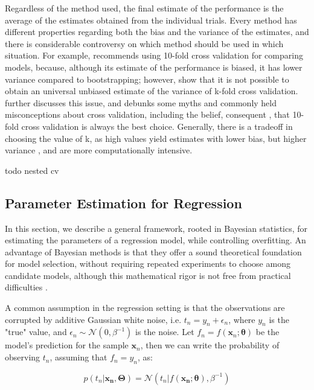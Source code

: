 \documentclass[12pt]{book}
\begin{document}
Regardless of the method used, the final estimate of the performance is the average of the estimates obtained from the individual trials. Every method has different properties regarding both the bias and the variance of the estimates, and there is considerable controversy on which method should be used in which situation. For example, \cite{cv_bootstrap} recommends using 10-fold cross validation for comparing models, because, although its estimate of the performance is biased, it has lower variance compared to bootstrapping; however, \cite{no_unbiased_cv} show that it is not possible to obtain an universal unbiased estimate of the variance of k-fold cross validation. \cite{cvmyths} further discusses this issue, and debunks some myths and commonly held misconceptions about cross validation, including the belief, consequent \cite{cv_bootstrap}, that 10-fold cross validation is always the best choice. Generally, there is a tradeoff in choosing the value of k, as high values yield estimates with lower bias, but higher variance \citep{cv_survey}, and are more computationally intensive.

todo nested cv \cite{nested_cv}

\subsection{Parameter Estimation for Regression}
\label{sec:regression_fit}

In this section, we describe a general framework, rooted in Bayesian statistics, for estimating the parameters of a regression model, while controlling overfitting. An advantage of Bayesian methods is that they offer a sound theoretical foundation for model selection, without requiring repeated experiments to choose among candidate models, although this mathematical rigor is not free from practical difficulties \citep{bayesian_model_selection, practical_bayesian_model_selection}.

A common assumption in the regression setting is that the observations are corrupted by additive Gaussian white noise, i.e. $t_n=y_n+\epsilon_n$, where $y_n$ is the "true" value, and $\epsilon_n\sim\mathcal{N}(0,\beta^{-1})$ is the noise. Let $f_n=f(\bm x_n;\bm{\theta})$ be the model's prediction for the sample $\bm x_n$, then we can write the probability of observing $t_n$, assuming that $f_n=y_n$, as:

\begin{equation}
\label{eq:model_pred_distrib}
p(t_n\vert \bm{x_n},\bm\Theta)=\mathcal{N}(t_n\vert f(\bm{x_n};\bm\theta),\beta^{-1})
\end{equation}
\end{document}
